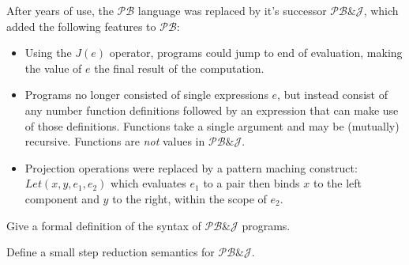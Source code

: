 \documentclass[11pt]{article}
\newcommand\mexp{e}
\newcommand\Plang{\mathcal{PB}}
\newcommand\PPlang{\mathcal{PB\&J}}
\begin{document}
\newpage
After years of use, the $\Plang$ language was replaced by it's
successor $\PPlang$, which added the following features to $\Plang$:

\begin{itemize}
\item Using the $\mathit{J}(\mexp)$ operator, programs could jump to end of
  evaluation, making the value of $\mexp$ the final result of the computation.

\item Programs no longer consisted of single expressions $\mexp$, but
  instead consist of any number function definitions followed by an
  expression that can make use of those definitions.  Functions take a
  single argument and may be (mutually) recursive.  Functions are
  \emph{not} values in $\PPlang$.

\item Projection operations were replaced by a pattern maching
  construct: $\mathit{Let}(x,y,e_1,e_2)$ which evaluates $e_1$ to a
  pair then binds $x$ to the left component and $y$ to the right,
  within the scope of $e_2$.
\end{itemize}

\vspace{.5in}

\begin{exercise}
Give a formal definition of the syntax of $\PPlang$ programs.
\end{exercise}

\newpage

\begin{exercise}
Define a small step reduction semantics for $\PPlang$.
\end{exercise}
\end{document}

